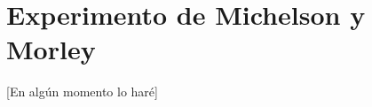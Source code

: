 \documentclass[../main.tex]{subfiles}
\begin{document}
\section{Experimento de Michelson y Morley}
[En algún momento lo haré]
\end{document}
